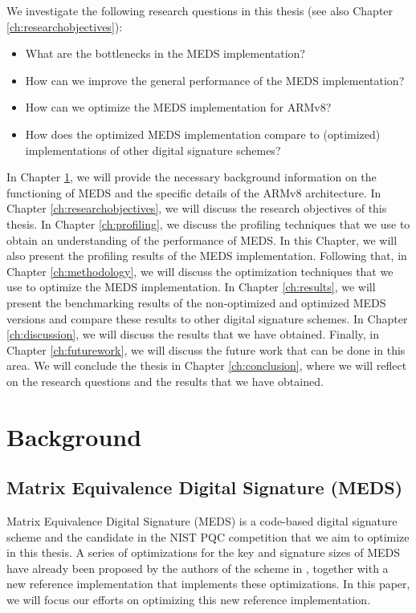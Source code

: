 \documentclass[11pt,a4paper]{report}
\theoremstyle{definition}
\begin{document}
We investigate the following research questions in this thesis (see also Chapter \ref{ch:researchobjectives}):
\begin{itemize}
  \item What are the bottlenecks in the MEDS implementation?
  \item How can we improve the general performance of the MEDS implementation?
  \item How can we optimize the MEDS implementation for ARMv8?
  \item How does the optimized MEDS implementation compare to (optimized) implementations of other digital signature schemes?
\end{itemize}

In Chapter \ref{ch:background}, we will provide the necessary background information on the functioning of MEDS and the specific details of the ARMv8 architecture. In Chapter \ref{ch:researchobjectives}, we will discuss the research objectives of this thesis. In Chapter \ref{ch:profiling}, we discuss the profiling techniques that we use to obtain an understanding of the performance of MEDS. In this Chapter, we will also present the profiling results of the MEDS implementation. Following that, in Chapter \ref{ch:methodology}, we will discuss the optimization techniques that we use to optimize the MEDS implementation. In Chapter \ref{ch:results}, we will present the benchmarking results of the non-optimized and optimized MEDS versions and compare these results to other digital signature schemes. In Chapter \ref{ch:discussion}, we will discuss the results that we have obtained. Finally, in Chapter \ref{ch:futurework}, we will discuss the future work that can be done in this area. We will conclude the thesis in Chapter \ref{ch:conclusion}, where we will reflect on the research questions and the results that we have obtained.

\chapter{Background}
\label{ch:background}

\section{Matrix Equivalence Digital Signature (MEDS)}
\label{sec:meds}
Matrix Equivalence Digital Signature (MEDS) \cite{chou2023take} is a code-based digital signature scheme and the candidate in the NIST PQC competition that we aim to optimize in this thesis. A series of optimizations for the key and signature sizes of MEDS have already been proposed by the authors of the scheme in \cite{chou2024reducing}, together with a new reference implementation that implements these optimizations. In this paper, we will focus our efforts on optimizing this new reference implementation.
\end{document}
